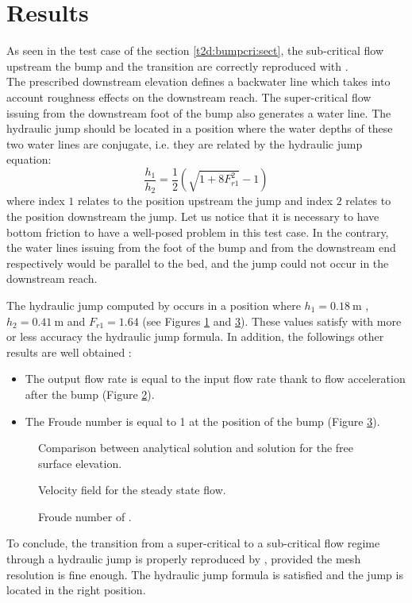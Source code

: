 \section{Results}
\bigskip
As seen in the test case of the section \ref{t2d:bumpcri:sect}, 
the sub-critical flow upstream the bump and the transition are 
correctly reproduced with .\\
The prescribed downstream elevation defines a backwater line which 
takes into account roughness effects on the downstream reach. 
The super-critical flow issuing from the downstream foot of 
the bump also generates a water line. The hydraulic jump should be 
located in a position where the water depths of these two water lines 
are conjugate, i.e. they are related by the hydraulic jump equation:
 \begin{equation*}
 \frac{h_1}{h_2}=\frac{1}{2}\left(\sqrt{1+8 F_{r1}^2}-1\right)
 \end{equation*}
where index $1$ relates to the position upstream the jump and index $2$ 
relates to the position downstream the jump. Let us notice that 
it is necessary to have bottom friction to have a well-posed problem in 
this test case. In the contrary, the water lines issuing from the foot of 
the bump and from the downstream end respectively would be parallel to the bed,
 and the jump could not occur in the downstream reach.

\bigskip
The hydraulic jump computed by  occurs in a position where 
$h_1=0.18~\text{m}$ , $h_2=0.41~\text{m}$ and $F_{r1} = 1.64$ 
(see Figures \ref{t2d:hydraulic_jump:fig:h} and \ref{t2d:hydraulic_jump:fig:fr}). 
These values satisfy with more or less accuracy the hydraulic jump formula.
In addition, the followings other results are well obtained :
\begin{itemize}
\item The output flow rate is equal to the input flow rate thank to flow 
acceleration after the bump (Figure \ref{t2d:hydraulic_jump:fig:velo}).
\item The Froude number is equal to 1 at the position of the bump 
(Figure \ref{t2d:hydraulic_jump:fig:fr}).
\end{itemize}
%
\begin{figure}[!htbp]
 \centering
 \caption{Comparison between analytical solution and  solution for the free surface elevation.}
 \label{t2d:hydraulic_jump:fig:h}
\end{figure}
\begin{figure}[!htbp]
 \centering
 \caption{Velocity field for the steady state flow.}
 \label{t2d:hydraulic_jump:fig:velo}
\end{figure}
%
\begin{figure}[!htbp]
 \centering
 \caption{Froude number of .}
 \label{t2d:hydraulic_jump:fig:fr}
\end{figure}

\bigskip
To conclude, the transition from a super-critical to a sub-critical 
flow regime through a hydraulic jump is properly reproduced by , 
provided the mesh resolution is fine enough. The hydraulic jump formula is satisfied 
and the jump is located in the right position.



